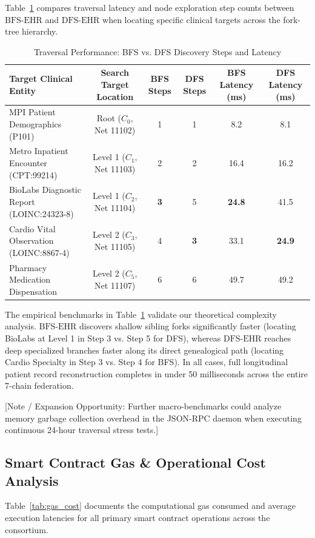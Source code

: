 Table~\ref{tab:traversal_benchmarks} compares traversal latency and node exploration step counts between $\text{BFS-EHR}$ and $\text{DFS-EHR}$ when locating specific clinical targets across the fork-tree hierarchy.

\begin{table}[t]
\centering
\caption{Traversal Performance: BFS vs. DFS Discovery Steps and Latency}
\label{tab:traversal_benchmarks}
\footnotesize
\setlength{\tabcolsep}{8pt}
\begin{tabular}{lccccc}
\toprule
\textbf{Target Clinical Entity} & \textbf{Search Target Location} & \textbf{BFS Steps} & \textbf{DFS Steps} & \textbf{BFS Latency (ms)} & \textbf{DFS Latency (ms)} \\
\midrule
MPI Patient Demographics (P101)  & Root ($C_0$, Net 11102) & 1 & 1 & 8.2 & 8.1 \\
Metro Inpatient Encounter (CPT:99214) & Level 1 ($C_1$, Net 11103) & 2 & 2 & 16.4 & 16.2 \\
BioLabs Diagnostic Report (LOINC:24323-8) & Level 1 ($C_2$, Net 11104) & \textbf{3} & 5 & \textbf{24.8} & 41.5 \\
Cardio Vital Observation (LOINC:8867-4) & Level 2 ($C_3$, Net 11105) & 4 & \textbf{3} & 33.1 & \textbf{24.9} \\
Pharmacy Medication Dispensation & Level 2 ($C_5$, Net 11107) & 6 & 6 & 49.7 & 49.2 \\
\bottomrule
\end{tabular}
\end{table}

The empirical benchmarks in Table~\ref{tab:traversal_benchmarks} validate our theoretical complexity analysis. $\text{BFS-EHR}$ discovers shallow sibling forks significantly faster (locating BioLabs at Level 1 in Step 3 vs. Step 5 for DFS), whereas $\text{DFS-EHR}$ reaches deep specialized branches faster along its direct genealogical path (locating Cardio Specialty in Step 3 vs. Step 4 for BFS). In all cases, full longitudinal patient record reconstruction completes in under 50 milliseconds across the entire 7-chain federation.

[Note / Expansion Opportunity: Further macro-benchmarks could analyze memory garbage collection overhead in the JSON-RPC daemon when executing continuous 24-hour traversal stress tests.]

\subsection{Smart Contract Gas \& Operational Cost Analysis}
Table~\ref{tab:gas_cost} documents the computational gas consumed and average execution latencies for all primary smart contract operations across the consortium.

